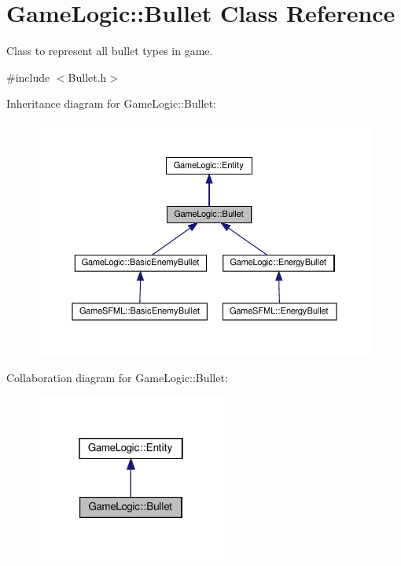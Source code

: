 \hypertarget{classGameLogic_1_1Bullet}{}\section{Game\+Logic\+:\+:Bullet Class Reference}
\label{classGameLogic_1_1Bullet}


Class to represent all bullet types in game.  




{\ttfamily \#include $<$Bullet.\+h$>$}



Inheritance diagram for Game\+Logic\+:\+:Bullet\+:
\nopagebreak
\begin{figure}[H]
\begin{center}
\leavevmode
\includegraphics[width=350pt]{classGameLogic_1_1Bullet__inherit__graph}
\end{center}
\end{figure}


Collaboration diagram for Game\+Logic\+:\+:Bullet\+:\nopagebreak
\begin{figure}[H]
\begin{center}
\leavevmode
\includegraphics[width=178pt]{classGameLogic_1_1Bullet__coll__graph}
\end{center}
\end{figure}
